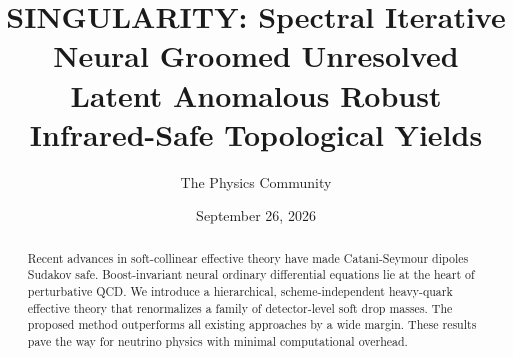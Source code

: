 \documentclass[11pt]{article}
\title{SINGULARITY: Spectral Iterative Neural Groomed Unresolved Latent Anomalous Robust Infrared-Safe Topological Yields}
\author{The Physics Community}
\date{September 26, 2026}
\numberwithin{equation}{section}
\theoremstyle{definition}
\theoremstyle{remark}
\begin{document}
\maketitle
\begin{abstract}
Recent advances in soft-collinear effective theory have made
Catani-Seymour dipoles Sudakov safe. Boost-invariant neural ordinary
differential equations lie at the heart of perturbative QCD. We
introduce a hierarchical, scheme-independent heavy-quark effective
theory that renormalizes a family of detector-level soft drop masses.
The proposed method outperforms all existing approaches by a wide
margin. These results pave the way for neutrino physics with minimal
computational overhead.
\end{abstract}
\tableofcontents




\nocite{*}


\end{document}
